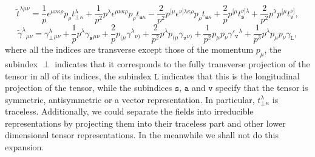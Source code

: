 \documentclass[aps,prd,12pt,twocolumn,superscriptaddress,showpacs,showkeys,reprint%
]{revtex4-1}
\renewcommand{\(}{\left(}
\renewcommand{\)}{\right)}
\renewcommand{\[}{\left[}
\renewcommand{\]}{\right]}
\begin{document}
\begin{dmath}
  \label{transverset}
  \tilde t^{\lambda\mu\nu}=\frac{1}{p}\epsilon^{\mu\nu\kappa\rho}p_\rho t_\perp^{\lambda}{}_\kappa+\frac{1}{p^2}p^\lambda\epsilon^{\mu\nu\kappa\rho}p_\rho t_{\texttt{a}\kappa}-\frac{2}{p^2}p^{[\mu}\epsilon^{\nu]\lambda\kappa\rho}p_\rho t_{\texttt{a}\kappa}+\frac{2}{p}p^{[\mu} t_{\texttt{s}}^{\nu]\lambda}+\frac{2}{p^2}p^\lambda p^{[\mu} t_{\texttt{v}}^{\nu]},
\end{dmath}
\begin{dmath}
  \label{transversegamma}
  \tilde \gamma^{\lambda}{}_{\mu\nu}=\gamma_\perp^{\lambda}{}_{\mu\nu}+\frac{1}{p}p^\lambda \gamma_{\texttt{s}}{}_{\mu\nu}+\frac{2}{p}p_{(\mu} \gamma^\lambda{}_{\nu)}+\frac{2}{p^2}p^\lambda p_{(\mu} \gamma_{\texttt{v}}{}_{\nu)}+ \frac{1}{p^2}p_{\mu} p_{\nu} \gamma'_{\texttt{v}}{}^\lambda+\frac{1}{p^3}p^\lambda p_{\mu} p_{\nu} \gamma_{\texttt{L}},
\end{dmath}
where all the indices are transverse except those of the momentum $p_\mu$, the subindex $\perp$ indicates that it corresponds to the fully transverse projection of the tensor in all of its indices, the subindex ${\texttt{L}}$ indicates that this is the longitudinal projection of the tensor, while the subindices $\texttt{s}$, $\texttt{a}$ and $\texttt{v}$ specify that the tensor is symmetric, antisymmetric or a vector representation. In particular, $t_\perp^{\lambda}{}_\kappa$ is traceless. Additionally, we could separate the fields into irreducible representations by projecting them into their traceless part and other lower dimensional tensor representations. In the meanwhile we shall not do this expansion.
\end{document}
